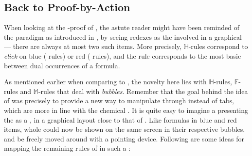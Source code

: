 \begin{scope}
\section{Back to Proof-by-Action}

When looking at the -proof of , the astute reader might
have been reminded of the  paradigm as introduced in
, by seeing redexes as the  involved in a graphical 
--- there are always at most two such items. More precisely, $\mathbb{H}$-rules
correspond to \emph{click}  on blue ({\rnm{\mcirc{-}}} rules) or red
 ({\rnm{\mcirc{+}}} rules), and the {} rule corresponds to
the most basic   between dual occurrences of a formula.

As mentioned earlier when comparing  to , the novelty here lies
with $\mathbb{H}$-rules, $\mathbb{F}$-rules and $\mathbb{M}$-rules that deal
with \emph{bubbles}. Remember that the goal behind the idea of 
was precisely to provide a new way to manipulate  through 
instead of tabs, which are more in line with the chemical . It is quite
easy to imagine a  presenting the  as a , in a graphical
layout close to that of . Like formulas in blue and red
items, whole  could now be shown on the same screen in their respective
bubbles, and be freely moved around with a pointing device. Following are some
ideas for mapping the remaining rules of  in such a :


%   


\end{scope}
